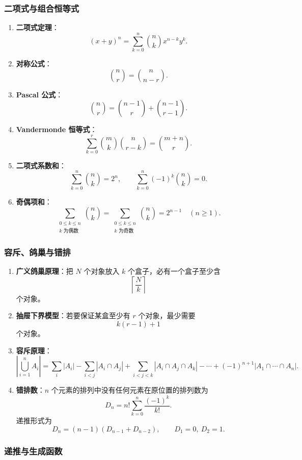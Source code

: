\subsubsection{二项式与组合恒等式}

\begin{enumerate}
	\item \textbf{二项式定理}：
	\[
	(x+y)^n=\sum_{k=0}^n\binom nkx^{n-k}y^k.
	\]
	\item \textbf{对称公式}：
	\[
	\binom nr=\binom n{n-r}.
	\]
	\item \textbf{Pascal 公式}：
	\[
	\binom nr=\binom{n-1}{r}+\binom{n-1}{r-1}.
	\]
	\item \textbf{Vandermonde 恒等式}：
	\[
	\sum_{k=0}^r\binom mk\binom n{r-k}=\binom{m+n}{r}.
	\]
	\item \textbf{二项式系数和}：
	\[
	\sum_{k=0}^n\binom nk=2^n,\qquad
	\sum_{k=0}^n(-1)^k\binom nk=0.
	\]
	\item \textbf{奇偶项和}：
	\[
	\sum_{\substack{0\le k\le n\\k\text{ 为偶数}}}\binom nk
	=
	\sum_{\substack{0\le k\le n\\k\text{ 为奇数}}}\binom nk
	=2^{n-1}\quad(n\ge1).
	\]
\end{enumerate}

\subsubsection{容斥、鸽巢与错排}

\begin{enumerate}
	\item \textbf{广义鸽巢原理}：把 \(N\) 个对象放入 \(k\) 个盒子，必有一个盒子至少含
	\[
	\left\lceil\frac Nk\right\rceil
	\]
	个对象。
	\item \textbf{抽屉下界模型}：若要保证某盒至少有 \(r\) 个对象，最少需要
	\[
	k(r-1)+1
	\]
	个对象。
	\item \textbf{容斥原理}：
	\[
	\left|\bigcup_{i=1}^nA_i\right|
	=
	\sum_i|A_i|-\sum_{i<j}|A_i\cap A_j|+\sum_{i<j<k}|A_i\cap A_j\cap A_k|-\cdots+(-1)^{n+1}|A_1\cap\cdots\cap A_n|.
	\]
	\item \textbf{错排数}：\(n\) 个元素的排列中没有任何元素在原位置的排列数为
	\[
	D_n=n!\sum_{k=0}^n\frac{(-1)^k}{k!}.
	\]
	递推形式为
	\[
	D_n=(n-1)(D_{n-1}+D_{n-2}),\qquad D_1=0,\ D_2=1.
	\]
\end{enumerate}

\subsubsection{递推与生成函数}

